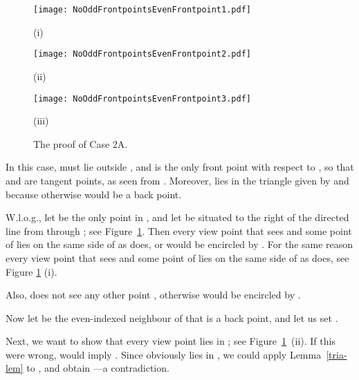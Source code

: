 \documentclass[11pt]{article}
\begin{document}
\begin{figure}[hbtp]\begin{minipage}[t]{0.28\textwidth}
\begin{center}\texttt{[image: NoOddFrontpointsEvenFrontpoint1.pdf]}

(i)
\end{center}\end{minipage}
\hfill
\begin{minipage}[t]{0.34\textwidth}
\begin{center}\texttt{[image: NoOddFrontpointsEvenFrontpoint2.pdf]}

(ii)
\end{center}\end{minipage}
\hfill
\begin{minipage}[t]{0.34\textwidth}
\begin{center}\texttt{[image: NoOddFrontpointsEvenFrontpoint3.pdf]}

(iii)
\end{center}\end{minipage}
\caption{The proof of Case 2A.}
\label{NoOddFrontpointsEvenFrontpoint-fig}
\end{figure}


In this case,  must lie outside , and  is the only front point with respect to , so that  and  
are tangent points, as seen from .  Moreover,  lies in the triangle given by  and  
because otherwise  would be a back point.


W.l.o.g., let  be the only point in , and let  be situated to the right of the directed line from  through ;
see Figure~\ref{NoOddFrontpointsEvenFrontpoint-fig}.
Then every view point  that sees  and some point  of  lies on the same side of  as  does,
or  would be encircled by . 
For the same reason every view point  that sees  and some point  of  lies on the same side of  as  does,
see Figure \ref{NoOddFrontpointsEvenFrontpoint-fig} (i).

Also,  does not see any other point , otherwise  would be encircled by . 


Now let  be the even-indexed neighbour of  that is a back point, and let us set 
. 

Next, we want to show that every view point  lies in ;
see Figure~\ref{NoOddFrontpointsEvenFrontpoint-fig}~(ii). If this were wrong,
 would imply
. Since  obviously lies in ,
we could apply Lemma~\ref{tria-lem} to , and obtain
---a contradiction.
\end{document}
